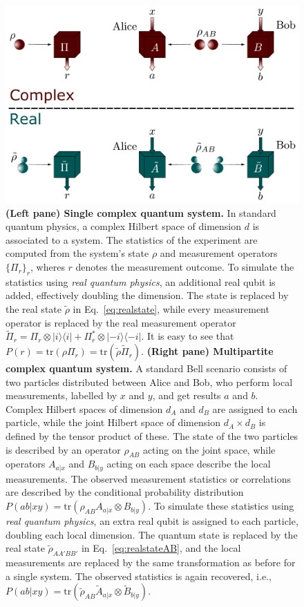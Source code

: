 \documentclass[onecolumn,prx,amsmath,amssymb,12pt]{revtex4-2}
\def\bra#1{\langle#1|} \def\ket#1{|#1\rangle}
\def\proj#1{\ket{#1}\!\bra{#1}}
\def\tr{\mbox{tr}}
\begin{document}
\begin{figure}
  \centering
  \includegraphics[width=12cm]{rvsc.pdf}
  \caption{\textbf{(Left pane) Single complex quantum system.} In standard quantum physics, a complex Hilbert space of dimension $d$ is associated to a system. The statistics of the experiment are computed from the system's state $\rho$ and measurement operators $\{\Pi_r\}_r$, wheres $r$ denotes the measurement outcome. To simulate the statistics using {\em real quantum physics}, an additional real qubit is added, effectively doubling the dimension. The state is replaced by the real state $\tilde{\rho}$ in Eq.~\eqref{eq:realstate}, while every measurement operator is replaced by the real measurement operator $\tilde\Pi_r=\Pi_r\otimes\proj{i}+\Pi_r^*\otimes\proj{-i}$. It is easy to see that $P(r)=\tr(\rho\Pi_r)=\tr(\tilde\rho\tilde\Pi_r)$. \textbf{(Right pane) Multipartite complex quantum system.} A standard Bell scenario consists of two particles distributed between Alice and Bob, who perform local measurements, labelled by $x$ and $y$, and get results $a$ and $b$. Complex Hilbert spaces of dimension $d_A$ and $d_B$ are assigned to each particle, while the joint Hilbert space of dimension $d_A\times d_B$ is defined by the tensor product of these. The state of the two particles is described by an operator $\rho_{AB}$ acting on the joint space, while operators $A_{a|x}$ and $B_{b|y}$ acting on each space describe the local measurements. The observed measurement statistics or correlations are described by the conditional probability distribution $P(ab|xy)=\tr(\rho_{AB}A_{a|x}\otimes B_{b|y})$. To simulate these statistics using {\em real quantum physics}, an extra real qubit is assigned to each particle, doubling each local dimension. The quantum state is replaced by the real state $\tilde \rho_{AA'BB'}$ in Eq.~\eqref{eq:realstateAB}, and the local measurements are replaced by the same transformation as before for a single system. The observed statistics is again recovered, i.e., $P(ab|xy)=\tr(\tilde\rho_{AB}\tilde{A}_{a|x}\otimes\tilde{B}_{b|y})$.}
  \label{fig:scenarios}
\end{figure}
\end{document}
